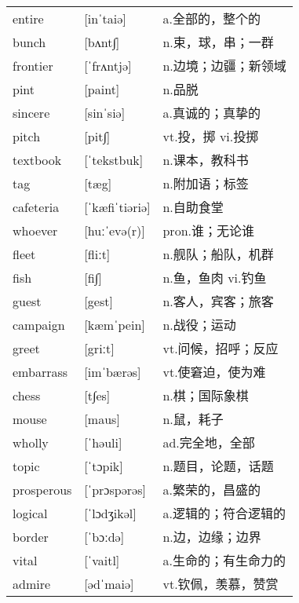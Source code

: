 \documentclass[a4paper]{article}
\begin{document}
\section{}
\begin{tabular}{l l l}

entire & [inˈtaiə] & a.全部的，整个的 \\
bunch & [bʌnt∫] & n.束，球，串；一群 \\
frontier & [ˈfrʌntjə] & n.边境；边疆；新领域 \\
pint & [paint] & n.品脱 \\
sincere & [sinˈsiə] & a.真诚的；真挚的 \\
pitch & [pit∫] & vt.投，掷 vi.投掷 \\
textbook & [ˈtekstbuk] & n.课本，教科书 \\
tag & [tæg] & n.附加语；标签 \\
cafeteria & [ˈkæfiˈtiəriə] & n.自助食堂 \\
whoever & [huːˈevə(r)] & pron.谁；无论谁 \\
fleet & [fliːt] & n.舰队；船队，机群 \\
fish & [fi∫] & n.鱼，鱼肉 vi.钓鱼 \\
guest & [gest] & n.客人，宾客；旅客 \\
campaign & [kæmˈpein] & n.战役；运动 \\
greet & [griːt] & vt.问候，招呼；反应 \\
embarrass & [imˈbærəs] & vt.使窘迫，使为难 \\
chess & [t∫es] & n.棋；国际象棋 \\
mouse & [maus] & n.鼠，耗子 \\
wholly & [ˈhəuli] & ad.完全地，全部 \\
topic & [ˈtɔpik] & n.题目，论题，话题 \\
prosperous & [ˈprɔspərəs] & a.繁荣的，昌盛的 \\
logical & [ˈlɔdʒikəl] & a.逻辑的；符合逻辑的 \\
border & [ˈbɔːdə] & n.边，边缘；边界 \\
vital & [ˈvaitl] & a.生命的；有生命力的 \\
admire & [ədˈmaiə] & vt.钦佩，羡慕，赞赏 \\

\end{tabular}
\end{document}
